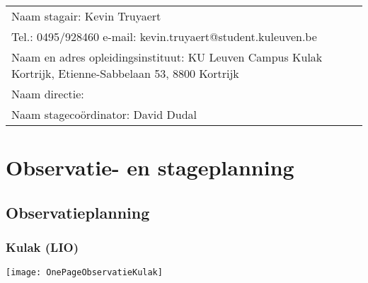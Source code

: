 
\begin{landscape}
	
	\begin{tabularx}{1.56\textwidth}{|X|}
		\hline
		Naam stagair:  Kevin Truyaert  \\
		Tel.: 0495/928460 \hspace{3cm} e-mail: kevin.truyaert@student.kuleuven.be  \\
		Naam en adres opleidingsinstituut:  KU Leuven Campus Kulak Kortrijk, Etienne-Sabbelaan 53, 8800 Kortrijk  \\
		Naam directie: \\
		Naam stagecoördinator:  David Dudal \\
		\hline
	\end{tabularx}
	\vspace*{-0.4cm}
\section{Observatie- en stageplanning}
\vspace*{-0.3cm}\subsection{Observatieplanning}
\subsubsection{Kulak (LIO)}%
\begin{center}
		\texttt{[image: OnePageObservatieKulak]}
\end{center}


\end{landscape}
